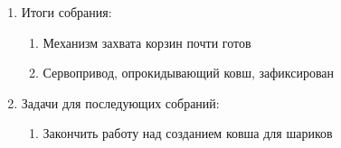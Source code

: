 \begin{enumerate}
\begin{enumerate}
	\end{enumerate}
	
	\item Итоги собрания:
	\begin{enumerate}
		\item Механизм захвата корзин почти готов
		
		\item Сервопривод, опрокидывающий ковш, зафиксирован
		
	\end{enumerate}
	
	\item Задачи для последующих собраний:
	\begin{enumerate}
		\item Закончить работу над созданием ковша для шариков
		
	\end{enumerate}     
\end{enumerate}

\fillpage

